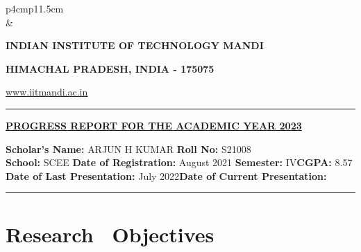 \documentclass[12 pt, a4paper]{article}
\newcommand{\HRule}{\rule{\linewidth}{1mm}}
\begin{document}
    \pagestyle{empty}
\vskip 0.2cm
	\begin{tabular}{p{4cm}p{11.5cm}}
		  \\
		& \centering \large\bf\phantom{Empty line}\\ 
		\rule{0pt}{1pt} \centering \large\bf{INDIAN INSTITUTE OF TECHNOLOGY MANDI} \\
		\rule{0pt}{1pt} \centering \large\bf{HIMACHAL PRADESH, INDIA - 175075} \\
		\rule{0pt}{1pt} \centering \underline{\href{www.iitmandi.ac.in}{www.iitmandi.ac.in}}\\
	\end{tabular}
\noindent

{\raggedleft{}\HRule}
 
\begin{center}
\large\bf\underline{PROGRESS REPORT FOR THE ACADEMIC YEAR 2023}
\end{center}
\indent \textbf{Scholar's Name:} {ARJUN H KUMAR} \hfill \textbf{Roll No:} {S21008\phantom{July23July23July202 }} \\
\noindent \textbf{School:} {SCEE} \hfill \textbf{Date of Registration: }{ August 2021} \newline
\noindent \textbf{Semester:} {IV}\hfill \textbf{CGPA: }{8.57\phantom{July23July23July23July20 }}
\newline
\noindent \textbf{Date of Last Presentation: }{ July 2022}\hfill \textbf{Date of Current Presentation: }{\phantom{July23}}
\\
\noindent\rule{17.69cm}{0.8pt}
   
\section{Research ~Objectives}
    
\end{document}
